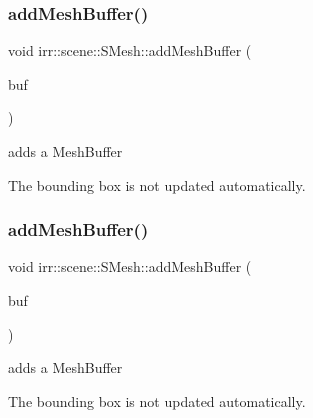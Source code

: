 \subsubsection{\texorpdfstring{add\+Mesh\+Buffer()}{addMeshBuffer()}\hspace{0.1cm}{\footnotesize\ttfamily [1/2]}}
{\footnotesize\ttfamily void irr\+::scene\+::\+S\+Mesh\+::add\+Mesh\+Buffer (\begin{DoxyParamCaption}\item[{\hyperlink{classirr_1_1scene_1_1IMeshBuffer}{I\+Mesh\+Buffer} $\ast$}]{buf }\end{DoxyParamCaption})\hspace{0.3cm}{\ttfamily [inline]}}



adds a Mesh\+Buffer 

The bounding box is not updated automatically. \mbox{\label{structirr_1_1scene_1_1SMesh_a890e7506262b2ebaf45ff95c681452bd}} 
\subsubsection{\texorpdfstring{add\+Mesh\+Buffer()}{addMeshBuffer()}\hspace{0.1cm}{\footnotesize\ttfamily [2/2]}}
{\footnotesize\ttfamily void irr\+::scene\+::\+S\+Mesh\+::add\+Mesh\+Buffer (\begin{DoxyParamCaption}\item[{\hyperlink{classirr_1_1scene_1_1IMeshBuffer}{I\+Mesh\+Buffer} $\ast$}]{buf }\end{DoxyParamCaption})\hspace{0.3cm}{\ttfamily [inline]}}



adds a Mesh\+Buffer 

The bounding box is not updated automatically. \mbox{\label{structirr_1_1scene_1_1SMesh_a768eeba9148e949d6962bee08517a056}} 
